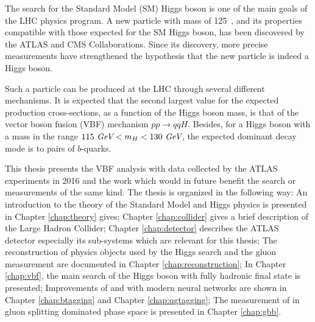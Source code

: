 The search for the Standard Model (SM) Higgs boson\cite{Englert:1964et,Higgs:1964pj,Higgs:1964ia,Guralnik:1964eu}  is one of the main goals of the LHC physics program.  A new particle with mass of 125~\gev, and its properties compatible with those expected for the SM Higgs boson, has been discovered by the ATLAS\cite{HIGG-2012-27} and CMS\cite{CMS-HIG-12-028} Collaborations. Since its discovery, more precise measurements have strengthened the hypothesis that the new particle is indeed a Higgs boson\cite{HIGG-2013-02,HIGG-2014-06,HIGG-2014-14,CMS-HIG-12-036,CMS-HIG-12-041}.

Such a particle can be produced at the LHC through several different mechanisms. It is expected that the second largest value for the expected production cross-sections\cite{Dittmaier:2011ti}, as a function of the Higgs boson mass, is that of the vector boson fusion (VBF) mechanism $pp\to qqH$. Besides, for a Higgs boson with a mass in the range $115~\textit{GeV} < m_{H} < 130~\textit{GeV}$, the expected dominant decay mode is to pairs of $b$-quarks.

This thesis presents the VBF \Hbb analysis with data collected by the ATLAS experiments in 2016 and the work which would in future benefit the search or measurements of the same kind. The thesis is organized in the following way: An introduction to the theory of the Standard Model and Higgs physics is presented in Chapter \ref{chap:theory} gives; Chapter \ref{chap:collider} gives a brief description of the Large Hadron Collider; Chapter \ref{chap:detector} describes the ATLAS detector especially its sub-systems which are relevant for this thesis; The reconstruction of physics objects used by the Higgs search and the gluon measurement are documented in Chapter \ref{chap:reconstruction}; In Chapter \ref{chap:vbf}, the main search of the Higgs boson with fully hadronic final state is presented; Improvements of \btagging and \qgtagging with modern neural networks are shown in Chapter \ref{chap:btagging} and Chapter \ref{chap:qgtagging}; The measurement of \gbb in gluon splitting dominated phase space is presented in Chapter \ref{chap:gbb}.
